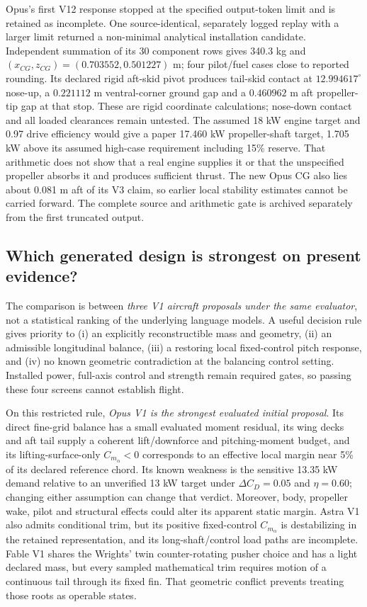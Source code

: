\documentclass[11pt,a4paper]{article}
\begin{document}
Opus's first V12 response stopped at the specified output-token limit and is retained as incomplete. One source-identical, separately logged replay with a larger limit returned a non-minimal analytical installation candidate. Independent summation of its 30 component rows gives 340.3 kg and $(x_{CG},z_{CG})=(0.703552,0.501227)$ m; four pilot/fuel cases close to reported rounding. Its declared rigid aft-skid pivot produces tail-skid contact at $12.994617^\circ$ nose-up, a $0.221112$ m ventral-corner ground gap and a $0.460962$ m aft propeller-tip gap at that stop. These are rigid coordinate calculations; nose-down contact and all loaded clearances remain untested. The assumed 18 kW engine target and 0.97 drive efficiency would give a paper 17.460 kW propeller-shaft target, 1.705 kW above its assumed high-case requirement including 15\% reserve. That arithmetic does not show that a real engine supplies it or that the unspecified propeller absorbs it and produces sufficient thrust. The new Opus CG also lies about 0.081 m aft of its V3 claim, so earlier local stability estimates cannot be carried forward. The complete source and arithmetic gate is archived separately from the first truncated output.

\subsection{Which generated design is strongest on present evidence?}
The comparison is between \emph{three V1 aircraft proposals under the same evaluator}, not a statistical ranking of the underlying language models. A useful decision rule gives priority to (i) an explicitly reconstructible mass and geometry, (ii) an admissible longitudinal balance, (iii) a restoring local fixed-control pitch response, and (iv) no known geometric contradiction at the balancing control setting. Installed power, full-axis control and strength remain required gates, so passing these four screens cannot establish flight.

On this restricted rule, \emph{Opus V1 is the strongest evaluated initial proposal}. Its direct fine-grid balance has a small evaluated moment residual, its wing decks and aft tail supply a coherent lift/downforce and pitching-moment budget, and its lifting-surface-only $C_{m_\alpha}<0$ corresponds to an effective local margin near 5\% of its declared reference chord. Its known weakness is the sensitive 13.35 kW demand relative to an unverified 13 kW target under $\Delta C_D=0.05$ and $\eta=0.60$; changing either assumption can change that verdict. Moreover, body, propeller wake, pilot and structural effects could alter its apparent static margin. Astra V1 also admits conditional trim, but its positive fixed-control $C_{m_\alpha}$ is destabilizing in the retained representation, and its long-shaft/control load paths are incomplete. Fable V1 shares the Wrights' twin counter-rotating pusher choice and has a light declared mass, but every sampled mathematical trim requires motion of a continuous tail through its fixed fin. That geometric conflict prevents treating those roots as operable states.
\end{document}
